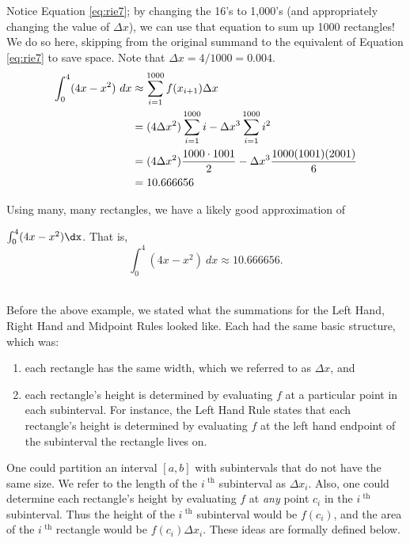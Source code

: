 {Notice  Equation \eqref{eq:rie7}; by changing the 16's to 1,000's (and appropriately changing the value of $\Delta x$), we can use that equation to sum up 1000 rectangles!
{}
We do so here, skipping from the original summand to the equivalent of Equation \eqref{eq:rie7} to save space. Note that $\Delta x = 4/1000 = 0.004$.
\begin{align}
\int_0^4 (4x-x^2)\ dx &\approx \sum_{i=1}^{1000} f(x_{i+1})\Delta x \notag\\
									&= (4\Delta x^2)\sum_{i=1}^{1000} i - \Delta x^3 \sum_{i=1}^{1000} i^2 \notag\\
									&= (4\Delta x^2)\frac{1000\cdot 1001}{2} - \Delta x^3 \frac{1000(1001)(2001)}6 \notag\\
									&=10.666656\notag
\end{align}

Using many, many rectangles, we have a likely good approximation of 

$\int_0^4 (4x-x^2)\dx$. That is, $$\int_0^4(4x-x^2)\ dx \approx 10.666656.$$
\baselineskip
}\\

Before the above example, we stated what the summations for the Left Hand, Right Hand and Midpoint Rules looked like. Each had the same basic structure, which was:
\begin{enumerate}
	\item each rectangle has the same width, which we referred to as $\Delta x$, and
	\item	each rectangle's height is determined by evaluating $f$ at a particular point in each subinterval. For instance, the Left Hand Rule states that each rectangle's height is determined by evaluating $f$ at the left hand endpoint of the subinterval the rectangle lives on.
\end{enumerate}
One could partition an interval $[a,b]$ with subintervals that do not have the same size. We refer to the length of the %
$i^\text{ th}$ subinterval as $\Delta x_i$. Also, one could determine each rectangle's height by evaluating $f$ at \emph{any} point $c_i$ in the $i^\text{ th}$ subinterval. %
Thus the height of the $i^\text{ th}$ subinterval would be $f(c_i)$, and the area of the $i^\text{ th}$ rectangle would be $f(c_i)\Delta x_i$. These ideas are formally defined below.

